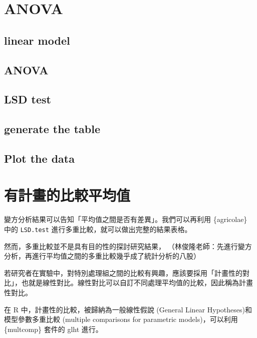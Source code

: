 \documentclass[
]{book}
\begin{document}
\hypertarget{anova}{%
\chapter{ANOVA}\label{anova}}

\hypertarget{linear-model}{%
\section{linear model}\label{linear-model}}

\hypertarget{anova-1}{%
\section{ANOVA}\label{anova-1}}

\hypertarget{lsd-test}{%
\section{LSD test}\label{lsd-test}}

\hypertarget{generate-the-table}{%
\section{generate the table}\label{generate-the-table}}

\hypertarget{plot-the-data}{%
\section{Plot the data}\label{plot-the-data}}

\hypertarget{ux6709ux8a08ux756bux7684ux6bd4ux8f03ux5e73ux5747ux503c}{%
\chapter{有計畫的比較平均值}\label{ux6709ux8a08ux756bux7684ux6bd4ux8f03ux5e73ux5747ux503c}}

變方分析結果可以告知「平均值之間是否有差異」。我們可以再利用 \{agricolae\} 中的 \texttt{LSD.test} 進行多重比較，就可以做出完整的結果表格。

然而，多重比較並不是具有目的性的探討研究結果，
（林俊隆老師：先進行變方分析，再進行平均值之間的多重比較幾乎成了統計分析的八股）

若研究者在實驗中，對特別處理組之間的比較有興趣，應該要採用「計畫性的對比」，也就是線性對比。線性對比可以自訂不同處理平均值的比較，因此稱為計畫性對比。

在 R 中，計畫性的比較，被歸納為一般線性假說 (General Linear Hypotheses)和模型參數多重比較 (multiple comparisons for parametric models)，可以利用 \{multcomp\} 套件的 glht 進行。
\end{document}
